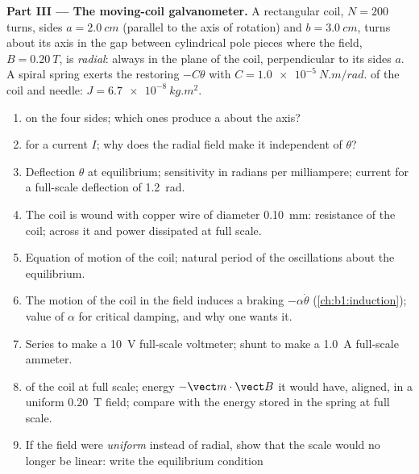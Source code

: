 \begin{problem}
\medskip
\noindent\textbf{Part III --- The moving-coil galvanometer.}
A rectangular coil, $N = 200$ turns, sides $a = \qty{2.0}{cm}$ (parallel to
the axis of rotation) and $b = \qty{3.0}{cm}$, turns about its axis in the
gap between cylindrical pole pieces where the field, $B = \qty{0.20}{T}$,
is \emph{radial}: always in the plane of the coil, perpendicular to its
sides $a$. A spiral spring exerts the restoring  $-C\theta$ with
$C = \qty{1.0e-5}{N.m/rad}$.  of the coil and needle:
$J = \qty{6.7e-8}{kg.m^2}$.
\begin{enumerate}[resume]
  \item {} on the four sides; which ones produce a 
        about the axis?
  \item {} for a current $I$; why does the radial field make it
        independent of $\theta$?
  \item Deflection $\theta$ at equilibrium; sensitivity in radians per
        milliampere; current for a full-scale deflection of \qty{1.2}{rad}.
  \item The coil is wound with copper wire of diameter \qty{0.10}{mm}:
        resistance of the coil;  across it and power dissipated at
        full scale.
  \item Equation of motion of the coil; natural period of the
        oscillations about the equilibrium.
  \item The motion of the coil in the field induces a braking 
        $-\alpha\dot\theta$ (\cref{ch:b1:induction}); value of $\alpha$ for
        critical damping, and why one wants it.
  \item Series  to make a \qty{10}{V} full-scale voltmeter; shunt
         to make a \qty{1.0}{A} full-scale ammeter.
  \item {} of the coil at full scale; energy $-\vect m\cdot
        \vect B$ it would have, aligned, in a uniform \qty{0.20}{T} field;
        compare with the energy stored in the spring at full scale.
  \item If the field were \emph{uniform} instead of radial, show that the
        scale would no longer be linear: write the equilibrium condition

\end{enumerate}
\end{problem}
